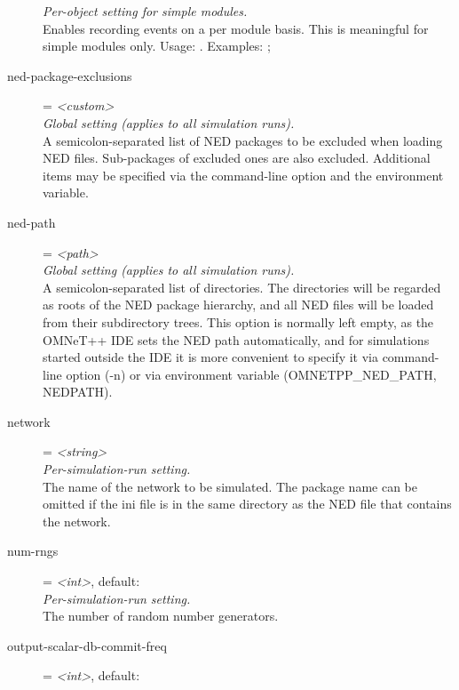 \begin{description}
    \textit{Per-object setting for simple modules.}\\
    Enables recording events on a per module basis. This is meaningful for
    simple modules only. Usage:
    .
    Examples:
    ;
\item[ned-package-exclusions] = \textit{<custom>}\\
    \textit{Global setting (applies to all simulation runs).}\\
    A semicolon-separated list of NED packages to be excluded when loading NED
    files. Sub-packages of excluded ones are also excluded. Additional items
    may be specified via the  command-line option and the
     environment variable.
\item[ned-path] = \textit{<path>}\\
    \textit{Global setting (applies to all simulation runs).}\\
    A semicolon-separated list of directories. The directories will be regarded
    as roots of the NED package hierarchy, and all NED files will be loaded
    from their subdirectory trees. This option is normally left empty, as the
    OMNeT++ IDE sets the NED path automatically, and for simulations started
    outside the IDE it is more convenient to specify it via command-line option
    (-n) or via environment variable (OMNETPP\_NED\_PATH, NEDPATH).
\item[network] = \textit{<string>}\\
    \textit{Per-simulation-run setting.}\\
    The name of the network to be simulated.  The package name can be omitted
    if the ini file is in the same directory as the NED file that contains the
    network.
\item[num-rngs] = \textit{<int>}, default: \\
    \textit{Per-simulation-run setting.}\\
    The number of random number generators.
\item[output-scalar-db-commit-freq] = \textit{<int>}, default: \\

\end{description}
